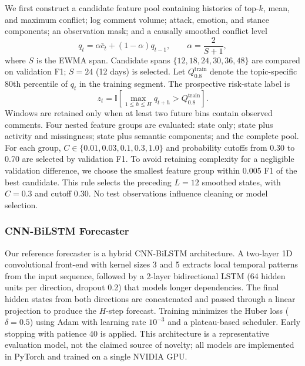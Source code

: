 \documentclass[journal]{IEEEtran}
\begin{document}
We first construct a candidate feature pool containing histories of top-$k$, mean, and maximum conflict; log comment volume; attack, emotion, and stance components; an observation mask; and a causally smoothed conflict level
\begin{equation}
q_t = \alpha \bar{c}_t + (1-\alpha)q_{t-1}, \qquad \alpha=\frac{2}{S+1},
\end{equation}
where $S$ is the EWMA span. Candidate spans $\{12,18,24,30,36,48\}$ are compared on validation F1; $S=24$ (12 days) is selected. Let $Q_{0.8}^{\mathrm{train}}$ denote the topic-specific 80th percentile of $q_t$ in the training segment. The prospective risk-state label is
\begin{equation}
z_t=\mathbb{I}\!\left[\max_{1\le h\le H}q_{t+h}>Q_{0.8}^{\mathrm{train}}\right].
\end{equation}
Windows are retained only when at least two future bins contain observed comments. Four nested feature groups are evaluated: state only; state plus activity and missingness; state plus semantic components; and the complete pool. For each group, $C\in\{0.01,0.03,0.1,0.3,1.0\}$ and probability cutoffs from 0.30 to 0.70 are selected by validation F1. To avoid retaining complexity for a negligible validation difference, we choose the smallest feature group within 0.005 F1 of the best candidate. This rule selects the preceding $L=12$ smoothed states, with $C=0.3$ and cutoff 0.30. No test observations influence cleaning or model selection.

\subsubsection{CNN-BiLSTM Forecaster}

Our reference forecaster is a hybrid CNN-BiLSTM architecture. A two-layer 1D convolutional front-end with kernel sizes 3 and 5 extracts local temporal patterns from the input sequence, followed by a 2-layer bidirectional LSTM (64 hidden units per direction, dropout 0.2) that models longer dependencies. The final hidden states from both directions are concatenated and passed through a linear projection to produce the $H$-step forecast. Training minimizes the Huber loss ($\delta=0.5$) using Adam with learning rate $10^{-3}$ and a plateau-based scheduler. Early stopping with patience 40 is applied. This architecture is a representative evaluation model, not the claimed source of novelty; all models are implemented in PyTorch and trained on a single NVIDIA GPU.
\end{document}
